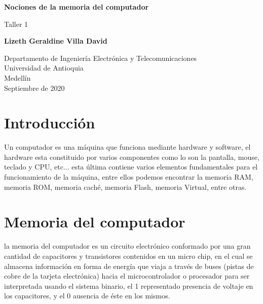 \documentclass{article}
\begin{document}
\begin{titlepage}
    \begin{center}
        \vspace*{1cm}
            
        \Huge
        \textbf{Nociones de la memoria del computador}
            
        \vspace{0.5cm}
        \LARGE
        Taller 1
            
        \vspace{1.5cm}
            
        \textbf{Lizeth Geraldine Villa David}
            
        \vfill
            
        \vspace{0.8cm}
            
        \Large
        Departamento de Ingeniería Electrónica y Telecomunicaciones\\
        Universidad de Antioquia\\
        Medellín\\
        Septiembre de 2020
            
    \end{center}
\end{titlepage}
\newpage 

\tableofcontents

\section{Introducción}\label{contenido}


Un computador es una máquina que funciona mediante hardware y software, 
el hardware esta constituido por varios componentes
como lo son la pantalla, mouse, teclado y CPU, etc... esta última contiene varios 
elementos fundamentales para el funcionamiento de la máquina, 
entre ellos podemos encontrar la memoria RAM, memoria ROM, memoria caché, 
memoria Flash, memoria Virtual, entre otras. 

\section{Memoria del computador}\label{contenido}

la memoria del computador es un circuito electrónico conformado por una gran cantidad de 
capacitores y transistores contenidos en un micro chip, en el cual se almacena información en forma de energía que viaja a través de buses (pistas de cobre de la tarjeta electrónica) hacia el microcontrolador o procesador para ser interpretada usando el sistema binario, el 1 representado presencia de voltaje en los capacitores, y el 0 ausencia de éste en los mismos.
\end{document}
